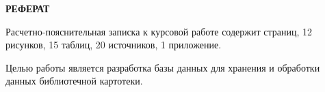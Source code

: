 \begin{center}
	\textbf{РЕФЕРАТ}
\end{center}

Расчетно-пояснительная записка к курсовой работе содержит страниц, 12 рисунков, 15 таблиц, 20 источников, 1 приложение.

Целью работы является разработка базы данных для хранения и обработки данных библиотечной картотеки.